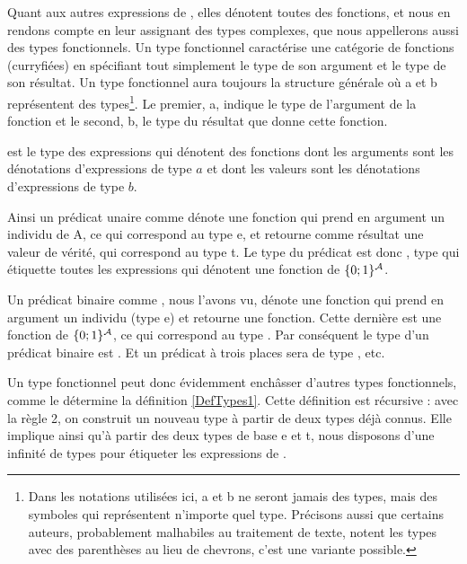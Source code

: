 Quant aux autres expressions de {\LO},  elles dénotent toutes des fonctions, et nous en rendons compte en leur assignant des types complexes, que nous appellerons aussi des types fonctionnels.
Un type fonctionnel caractérise une catégorie de fonctions (curryfiées) en spécifiant tout simplement le type de son argument et le type de son résultat. 
Un type fonctionnel aura toujours la structure générale  où \mtyp a et \mtyp b représentent des types\footnote{Dans les notations utilisées ici, \mtyp a et \mtyp b ne seront jamais des types, mais des symboles qui représentent n'importe quel type. Précisons aussi que certains auteurs, probablement malhabiles au traitement de texte, notent les types avec des parenthèses au lieu de chevrons, c'est une variante possible.}.  
Le premier, \mtyp a, indique le type de l'argument de la fonction et le second, \mtyp b, le type du résultat que donne cette fonction. 

\begin{point}
est le type des expressions qui dénotent des
fonctions dont les arguments sont les dénotations d'expressions de
type $a$ et dont les valeurs sont les dénotations d'expressions de
type $b$.  
\end{point}



Ainsi un prédicat unaire comme  dénote une fonction qui prend en argument un individu de \Unv A, ce qui correspond au type \typ e, et retourne comme résultat une valeur de vérité, qui correspond au type \typ t.  
Le type du prédicat est donc \et, type qui étiquette toutes les expressions qui dénotent une fonction de $\{ 0;1 \}^{\mathcal{A}}$.

Un prédicat binaire comme , nous l'avons vu, dénote une fonction qui prend en argument un individu (type \typ e) et retourne une fonction. 
Cette dernière est une fonction de $\{ 0;1 \}^{\mathcal{A}}$, ce qui correspond au type \et.  Par conséquent le type d'un prédicat binaire est \eet.
Et un prédicat à trois places sera de type , etc.


Un type fonctionnel peut donc évidemment enchâsser d'autres types fonctionnels, comme le détermine la définition \ref{DefTypes1}. Cette définition est récursive : avec la règle 2,
on construit un nouveau type à partir de deux types déjà connus. 
Elle implique ainsi qu'à partir des deux types de base \typ e et \typ t, nous disposons d'une infinité de types pour étiqueter les expressions de {\LO}.



